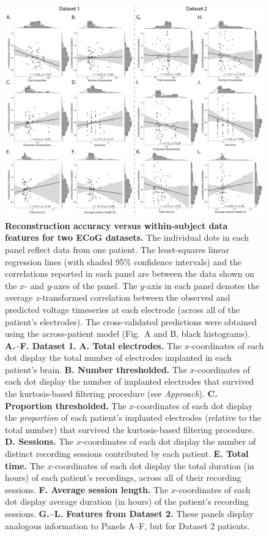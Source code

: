 \documentclass[11pt]{article}
\begin{document}
\begin{figure}[p]
\centering \includegraphics[width=\textwidth]{figs/supplemental_6}
\caption{\textbf{Reconstruction accuracy versus within-subject data features for
two ECoG datasets.} The individual dots in each panel  reflect data from one
patient.  The least-squares linear regression lines (with shaded 95\% confidence
intervals) and the correlations reported in each panel are between the data
shown on the $x$- and $y$-axes of the panel.  The $y$-axis in each panel
denotes the average $z$-transformed correlation between the observed and
predicted voltage timeseries at each electrode (across all of the patient's
electrodes). The cross-validated predictions were obtained using the
across-patient model (Fig.~\corrmaps A and B, black histograms).  \textbf{A.--F.
Dataset 1.}  \textbf{A. Total electrodes.}  The $x$-coordinates of each dot
display the total number of electrodes implanted in each patient's brain.
\textbf{B. Number thresholded.}  The $x$-coordinates of each dot display the
number of implanted electrodes that survived the kurtosis-based filtering
procedure (see \textit{Approach}).  \textbf{C. Proportion thresholded.} The
$x$-coordinates of each dot display the \textit{proportion} of each patient's
implanted electrodes (relative to the total number) that survived the
kurtosis-based filtering procedure.  \textbf{D. Sessions.}  The $x$-coordinates of each dot display the
number of distinct recording sessions contributed by each patient.  \textbf{E. Total time.} The $x$-coordinates of each dot display the
total duration (in hours) of each patient's recordings, across all of their recording sessions.  \textbf{F. Average session length.} The $x$-coordinates of each dot display average duration (in hours) of the patient's recording sessions.
  \textbf{G.--L. Features from Dataset 2.}  These panels display analogous information to Panels A--F, but for Dataset 2 patients.}
\label{fig:supplemental_6}
\end{figure}
\end{document}
